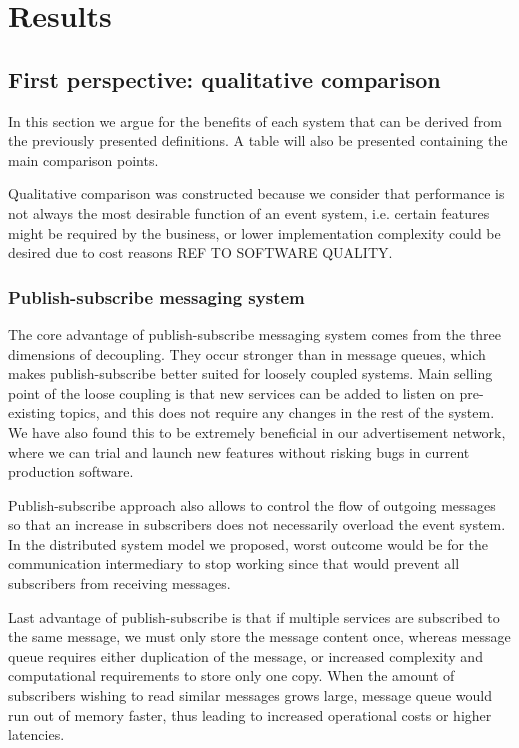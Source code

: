 \documentclass[conference]{IEEEtran}
\begin{document}
\section{Results}
\subsection{First perspective: qualitative comparison}
In this section we argue for the benefits of each system that can be derived from the previously presented definitions. A table will also be presented containing the main comparison points.

Qualitative comparison was constructed because we consider that performance is not always the most desirable function of an event system, i.e. certain features might be required by the business, or lower implementation complexity could be desired due to cost reasons REF TO SOFTWARE QUALITY.
\\

\subsubsection{Publish-subscribe messaging system}
The core advantage of publish-subscribe messaging system comes from the three dimensions of decoupling. They occur stronger than in message queues, which makes publish-subscribe better suited for loosely coupled systems. Main selling point of the loose coupling is that new services can be added to listen on pre-existing topics, and this does not require any changes in the rest of the system. We have also found this to be extremely beneficial in our advertisement network, where we can trial and launch new features without risking bugs in current production software. 

Publish-subscribe approach also allows to control the flow of outgoing messages so that an increase in subscribers does not necessarily overload the event system. In the distributed system model we proposed, worst outcome would be for the communication intermediary to stop working since that would prevent all subscribers from receiving messages.

Last advantage of publish-subscribe is that if multiple services are subscribed to the same message, we must only store the message content once, whereas message queue requires either duplication of the message, or increased complexity and computational requirements to store only one copy. When the amount of subscribers wishing to read similar messages grows large, message queue would run out of memory faster, thus leading to increased operational costs or higher latencies.
\\
\end{document}
